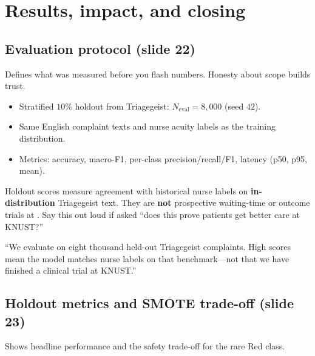 \section{Results, impact, and closing}
\label{sec:results}

\subsection{Evaluation protocol (slide 22)}

\begin{whybox}
Defines what was measured before you flash numbers. Honesty about scope builds trust.
\end{whybox}

\begin{itemize}
  \item Stratified \(10\%\) holdout from Triagegeist: \(N_{\mathrm{eval}}=8{,}000\) (seed \(42\)).
  \item Same English complaint texts and nurse acuity labels as the training distribution.
  \item Metrics: accuracy, macro-F1, per-class precision/recall/F1, latency (p50, p95, mean).
\end{itemize}

\begin{remark}
Holdout scores measure agreement with historical nurse labels on \textbf{in-distribution} Triagegeist text.
They are \textbf{not} prospective waiting-time or outcome trials at \examplehospital{} \citep{stewart2023nlp}.
Say this out loud if asked ``does this prove patients get better care at KNUST?''
\end{remark}

\begin{saybox}
``We evaluate on eight thousand held-out Triagegeist complaints. High scores mean the model matches nurse labels on that benchmark---not that we have finished a clinical trial at KNUST.''
\end{saybox}

\subsection{Holdout metrics and SMOTE trade-off (slide 23)}

\begin{whybox}
Shows headline performance and the safety trade-off for the rare Red class.
\end{whybox}


